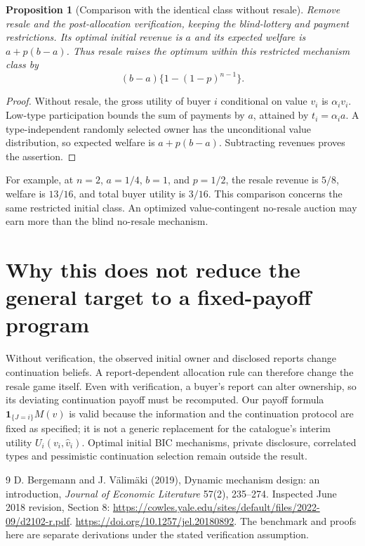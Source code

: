 \documentclass[11pt]{article}
\newtheorem{proposition}[theorem]{Proposition}
\theoremstyle{definition}
\theoremstyle{remark}
\begin{document}
\begin{proposition}[Comparison with the identical class without resale]
Remove resale and the post-allocation verification, keeping the blind-lottery and payment restrictions. Its optimal initial revenue is $a$ and its expected welfare is $a+p(b-a)$. Thus resale raises the optimum within this restricted mechanism class by
\[
 (b-a)\{1-(1-p)^{n-1}\}.
\]
\end{proposition}
\begin{proof}
Without resale, the gross utility of buyer $i$ conditional on value $v_i$ is $\alpha_i v_i$. Low-type participation bounds the sum of payments by $a$, attained by $t_i=\alpha_i a$. A type-independent randomly selected owner has the unconditional value distribution, so expected welfare is $a+p(b-a)$. Subtracting revenues proves the assertion.
\end{proof}

For example, at $n=2$, $a=1/4$, $b=1$, and $p=1/2$, the resale revenue is $5/8$, welfare is $13/16$, and total buyer utility is $3/16$. This comparison concerns the same restricted initial class. An optimized value-contingent no-resale auction may earn more than the blind no-resale mechanism.

\section{Why this does not reduce the general target to a fixed-payoff program}
Without verification, the observed initial owner and disclosed reports change continuation beliefs. A report-dependent allocation rule can therefore change the resale game itself. Even with verification, a buyer's report can alter ownership, so its deviating continuation payoff must be recomputed. Our payoff formula $\mathbf1_{\{J=i\}}M(v)$ is valid because the information and the continuation protocol are fixed as specified; it is not a generic replacement for the catalogue's interim utility $U_i(v_i,\widehat v_i)$. Optimal initial BIC mechanisms, private disclosure, correlated types and pessimistic continuation selection remain outside the result.

\begin{thebibliography}{9}
 D. Bergemann and J. V\"alim\"aki (2019), Dynamic mechanism design: an introduction, \emph{Journal of Economic Literature} 57(2), 235--274. Inspected June 2018 revision, Section 8: \url{https://cowles.yale.edu/sites/default/files/2022-09/d2102-r.pdf}. \url{https://doi.org/10.1257/jel.20180892}. The benchmark and proofs here are separate derivations under the stated verification assumption.
\end{thebibliography}
\end{document}
